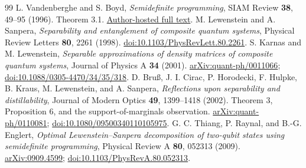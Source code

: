 \documentclass[11pt,a4paper]{article}
\theoremstyle{definition}\newtheorem{definition}[theorem]{Definition}
\theoremstyle{plain}\newtheorem*{theorem*}{Theorem}
\begin{document}
\begin{thebibliography}{99}
 L. Vandenberghe and S. Boyd, \emph{Semidefinite programming}, SIAM Review \textbf{38}, 49--95 (1996). Theorem 3.1. \href{https://web.stanford.edu/~boyd/papers/pdf/semidef_prog.pdf}{Author-hosted full text}.
 M. Lewenstein and A. Sanpera, \emph{Separability and entanglement of composite quantum systems}, Physical Review Letters \textbf{80}, 2261 (1998). \href{https://doi.org/10.1103/PhysRevLett.80.2261}{doi:10.1103/PhysRevLett.80.2261}.
 S. Karnas and M. Lewenstein, \emph{Separable approximations of density matrices of composite quantum systems}, Journal of Physics A \textbf{34} (2001). \href{https://arxiv.org/abs/quant-ph/0011066}{arXiv:quant-ph/0011066}; \href{https://doi.org/10.1088/0305-4470/34/35/318}{doi:10.1088/0305-4470/34/35/318}.
 D. Bru\ss, J. I. Cirac, P. Horodecki, F. Hulpke, B. Kraus, M. Lewenstein, and A. Sanpera, \emph{Reflections upon separability and distillability}, Journal of Modern Optics \textbf{49}, 1399--1418 (2002). Theorem 3, Proposition 6, and the support-of-marginals observation. \href{https://arxiv.org/abs/quant-ph/0110081}{arXiv:quant-ph/0110081}; \href{https://doi.org/10.1080/09500340110105975}{doi:10.1080/09500340110105975}.
 G. C. Thiang, P. Raynal, and B.-G. Englert, \emph{Optimal Lewenstein--Sanpera decomposition of two-qubit states using semidefinite programming}, Physical Review A \textbf{80}, 052313 (2009). \href{https://arxiv.org/abs/0909.4599}{arXiv:0909.4599}; \href{https://doi.org/10.1103/PhysRevA.80.052313}{doi:10.1103/PhysRevA.80.052313}.
\end{thebibliography}
\end{document}

